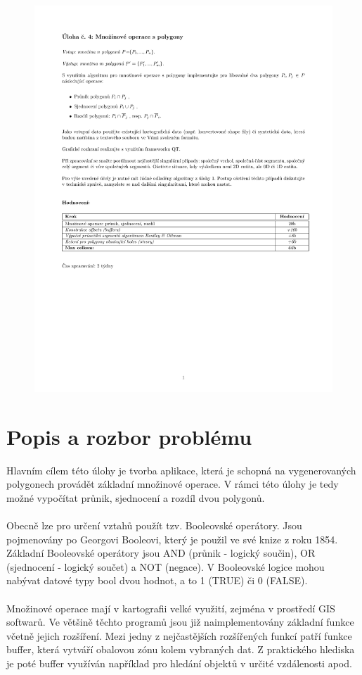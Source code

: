 \documentclass[a4paper, 12pt]{article}
\begin{document}
\begin{figure}[h!]
	\centering
	\includegraphics[width=17cm]{zadani.pdf}
\end{figure}




\section{Popis a rozbor problému}
Hlavním cílem této úlohy je tvorba aplikace, která je schopná na vygenerovaných polygonech provádět základní množinové operace. V rámci této úlohy je tedy možné vypočítat průnik, sjednocení a rozdíl dvou polygonů.\\
\\
Obecně lze pro určení vztahů použít tzv. Booleovské operátory. Jsou pojmenovány po Georgovi Booleovi, který je použil ve své knize z roku 1854. Základní Booleovské operátory jsou AND (průnik - logický součin), OR (sjednocení - logický součet) a NOT (negace). V Booleovské logice mohou nabývat datové typy bool dvou hodnot, a to 1 (TRUE) či 0 (FALSE). \\
\\
Množinové operace mají v kartografii velké využití, zejména v prostředí GIS softwarů. Ve většině těchto programů jsou již naimplementovány základní funkce včetně jejich rozšíření. Mezi jedny z nejčastějších rozšířených funkcí patří funkce buffer, která vytváří obalovou zónu kolem vybraných dat. Z praktického hlediska je poté buffer využíván například pro hledání objektů v určité vzdálenosti apod.
\end{document}
